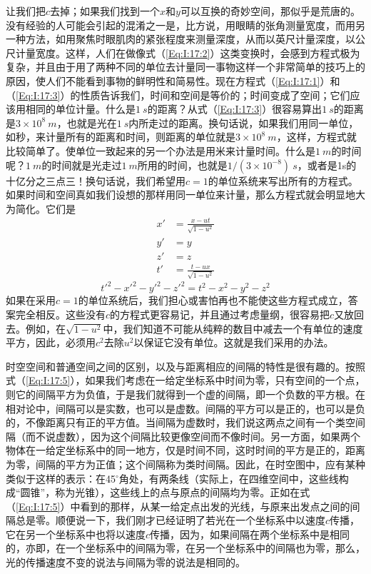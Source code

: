 让我们把$c$去掉；如果我们找到一个$x$和$y$可以互换的奇妙空间，那似乎是荒唐的。没有经验的人可能会引起的混淆之一是，比方说，用眼睛的张角测量宽度，而用另一种方法，如用聚焦时眼肌肉的紧张程度来测量深度，从而以英尺计量深度，以公尺计量宽度。这样，人们在做像式（\ref{Eq:I:17:2}）这类变换时，会感到方程式极为复杂，并且由于用了两种不同的单位去计量同一事物这样一个非常简单的技巧上的原因，使人们不能看到事物的鲜明性和简易性。现在方程式（\ref{Eq:I:17:1}）和（\ref{Eq:I:17:3}）的性质告诉我们，时间和空间是等价的；时间变成了空间；它们应该用相同的单位计量。什么是$1~s$的距离？从式（\ref{Eq:I:17:3}）很容易算出$1~s$的距离是$3 \times 10^8~m$，也就是光在$1~s$内所走过的距离。换句话说，如果我们用同一单位，如秒，来计量所有的距离和时间，则距离的单位就是$3 \times 10^8~m$，这样，方程式就比较简单了。使单位一致起来的另一个办法是用米来计量时间。什么是$1~m$的时间呢？$1~m$的时间就是光走过$1~m$所用的时间，也就是$1/(3×10^{-8})~s$，或者是1s的十亿分之三点三！换句话说，我们希望用$c=1$的单位系统来写出所有的方程式。如果时间和空间真如我们设想的那样用同一单位来计量，那么方程式就会明显地大为简化。它们是
\begin{equation}
    \label{Eq:I:17:4}
    \begin{aligned}
        x'&=\frac{x-ut}{\sqrt{1-u^2}} \\
        y'&=y \\
        z'&=z \\
        t'&=\frac{t-ux}{\sqrt{1-u^2}}
    \end{aligned}
\end{equation}
\begin{equation}
    \label{Eq:I:17:5}
    t'^2-x'^2-y'^2-z'^2=t^2-x^2-y^2-z^2
\end{equation}
如果在采用$c=1$的单位系统后，我们担心或害怕再也不能使这些方程式成立，答案完全相反。这些没有$c$的方程式更容易记，并且通过考虑量纲，很容易把$c$又放回去。例如，在$\sqrt{1-u^2}$中，我们知道不可能从纯粹的数目中减去一个有单位的速度平方，因此，必须用$c^2$去除$u^2$以保证它没有单位。这就是我们采用的办法。

时空空间和普通空间之间的区别，以及与距离相应的间隔的特性是很有趣的。按照式（\ref{Eq:I:17:5}），如果我们考虑在一给定坐标系中时间为零，只有空间的一个点，则它的间隔平方为负值，于是我们就得到一个虚的间隔，即一个负数的平方根。在相对论中，间隔可以是实数，也可以是虚数。间隔的平方可以是正的，也可以是负的，不像距离只有正的平方值。当间隔为虚数时，我们说这两点之间有一个类空间隔（而不说虚数），因为这个间隔比较更像空间而不像时间。另一方面，如果两个物体在一给定坐标系中的同一地方，仅是时间不同，这时时间的平方是正的，距离为零，间隔的平方为正值；这个间隔称为类时间隔。因此，在时空图中，应有某种类似于这样的表示：在45$^\circ$角处，有两条线（实际上，在四维空间中，这些线构成“圆锥”，称为光锥），这些线上的点与原点的间隔均为零。正如在式（\ref{Eq:I:17:5}）中看到的那样，从某一给定点出发的光线，与原来出发点之间的间隔总是零。顺便说一下，我们刚才已经证明了若光在一个坐标系中以速度$c$传播，它在另一个坐标系中也将以速度$c$传播，因为，如果间隔在两个坐标系中是相同的，亦即，在一个坐标系中的间隔为零，在另一个坐标系中的间隔也为零，那么，光的传播速度不变的说法与间隔为零的说法是相同的。

